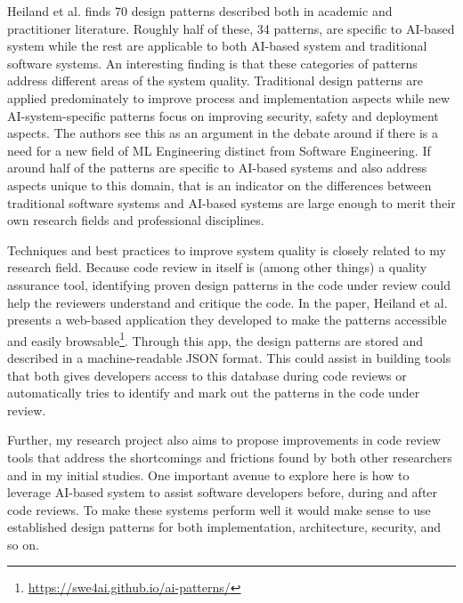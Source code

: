 \documentclass[a4paper,twocolumn]{article}
\begin{document}
Heiland et al. finds 70 design patterns described both in academic and
practitioner literature. Roughly half of these, 34 patterns, are specific to
AI-based system while the rest are applicable to both AI-based system and
traditional software systems. An interesting finding is that these categories of
patterns address different areas of the system quality. Traditional design
patterns are applied predominately to improve process and implementation aspects
while new AI-system-specific patterns focus on improving security, safety and
deployment aspects. The authors see this as an argument in the debate around if
there is a need for a new field of ML Engineering distinct from Software
Engineering. If around half of the patterns are specific to AI-based systems and
also address aspects unique to this domain, that is an indicator on
the differences between traditional software systems and AI-based systems are
large enough to merit their own research fields and professional disciplines.

Techniques and best practices to improve system quality is closely related to my
research field. Because code review in itself is (among other things) a quality
assurance tool, identifying proven design patterns in the code under review
could help the reviewers understand and critique the code. In the paper, Heiland
et al. presents a web-based application they developed to make the patterns
accessible and easily
browsable\footnote{\url{https://swe4ai.github.io/ai-patterns/}}. 
Through this app, the design patterns are stored and described in a
machine-readable JSON format. This could assist in building tools that both
gives developers access to this database during code reviews or automatically
tries to identify and mark out the patterns in the code under review.

Further, my research project also aims to propose improvements in code review
tools that address the shortcomings and frictions found by both other
researchers and in my initial studies. One important avenue to explore here is
how to leverage AI-based system to assist software developers before,
during and after code reviews. To make these systems perform well it would make
sense to use established design patterns for both implementation, architecture,
security, and so on.



\end{document}
